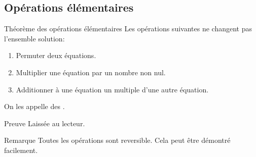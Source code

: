 \documentclass{article}
\begin{document}
\subsection{Opérations élémentaires}
\begin{parag}{Théorème des opérations élémentaires}
    Les opérations suivantes ne changent pas l'ensemble solution:
    \begin{enumerate}
        \item Permuter deux équations.
        \item Multiplier une équation par un nombre non nul.
        \item Additionner à une équation un multiple d'une autre équation.
    \end{enumerate}

    On les appelle des .

    \begin{subparag}{Preuve}
        Laissée au lecteur.
    \end{subparag}

    \begin{subparag}{Remarque}
        Toutes les opérations sont reversible. Cela peut être démontré facilement.
    \end{subparag}
\end{parag}
\end{document}
